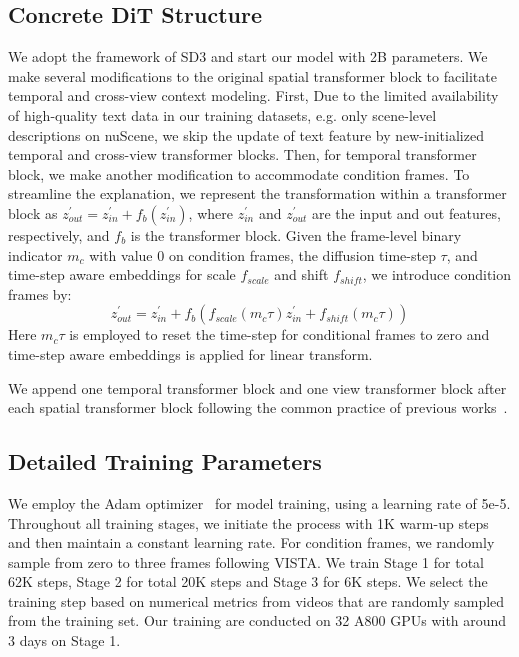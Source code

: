 \subsection{Concrete DiT Structure}
We adopt the framework of SD3 and start our model with 2B parameters. We make several modifications to the original spatial transformer block to facilitate temporal and cross-view context modeling. 
First, Due to the limited availability of high-quality text data in our training datasets, e.g. only scene-level descriptions on nuScene, we skip the update of text feature by new-initialized temporal and cross-view transformer blocks. Then, for temporal transformer block, we make another modification to accommodate condition frames. To streamline the explanation, we represent the transformation within a transformer block as $z^\prime_{out} = z^\prime_{in} + f_b(z^\prime_{in})$, where $z^\prime_{in}$ and $z^\prime_{out}$ are the input and out features, respectively, and $f_b$ is the transformer block. Given the frame-level binary indicator $m_c$ with value 0 on condition frames, the diffusion time-step $\tau$, and time-step aware embeddings for scale $f_{scale}$ and shift $f_{shift}$, we introduce condition frames by:
\begin{equation}
    z^\prime_{out} = z^\prime_{in} + f_b(f_{scale}(m_c \tau)z^\prime_{in} + f_{shift}(m_c \tau))
\end{equation}
Here $m_c \tau$ is employed to reset the time-step for conditional frames to zero and time-step aware embeddings is applied for linear transform. 

We append one temporal transformer block and one view transformer block after each spatial transformer block following the common practice of previous works~\cite{drive-wm,vista}.

\subsection{Detailed Training Parameters}
We employ the Adam optimizer~\cite{loshchilov2017decoupled} for model training, using a learning rate of 5e-5. Throughout all training stages, we initiate the process with 1K warm-up steps and then maintain a constant learning rate. For condition frames, we randomly sample from zero to three frames following VISTA. We train Stage 1 for total 62K steps, Stage 2 for total 20K steps and Stage 3 for 6K steps. We select the training step based on numerical metrics from videos that are randomly sampled from the training set. Our training are conducted on 32 A800 GPUs with around 3 days on Stage 1.

